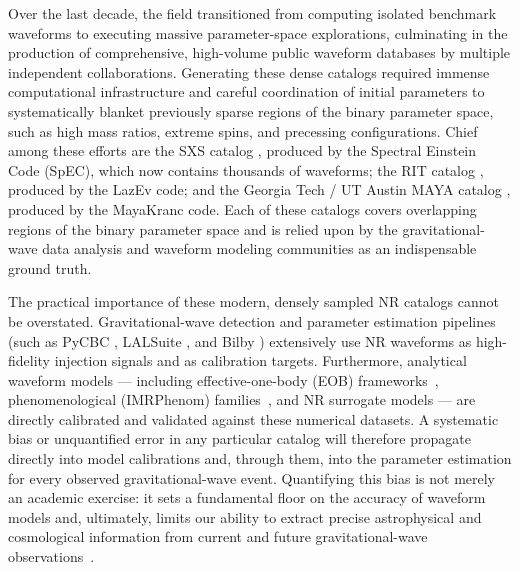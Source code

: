 \documentclass[%
 reprint,
superscriptaddress,
 amsmath,amssymb,
 aps,
]{revtex4-2}
\begin{document}
Over the last decade, the field transitioned from computing isolated benchmark waveforms to executing massive parameter-space explorations, culminating in the production of comprehensive, high-volume public waveform databases by multiple independent collaborations. Generating these dense catalogs required immense computational infrastructure and careful coordination of initial parameters to systematically blanket previously sparse regions of the binary parameter space, such as high mass ratios, extreme spins, and precessing configurations. Chief among these efforts are the SXS catalog \cite{Boyle:2008zua, Boyle:2019kee}, produced by the Spectral Einstein Code (SpEC), which now contains thousands of waveforms; the RIT catalog \cite{Healy:2020vre}, produced by the LazEv code; and the Georgia Tech / UT Austin MAYA catalog \cite{Jani:2016wkt}, produced by the MayaKranc code. Each of these catalogs covers overlapping regions of the binary parameter space and is relied upon by the gravitational-wave data analysis and waveform modeling communities as an indispensable ground truth.

The practical importance of these modern, densely sampled NR catalogs cannot be overstated. Gravitational-wave detection and parameter estimation pipelines (such as PyCBC \cite{Weaving:2023fji}, LALSuite \cite{Wette:2020air}, and Bilby \cite{Ashton:2018jfp, Romero-Shaw:2020owr, Veitch:2014wba}) extensively use NR waveforms as high-fidelity injection signals and as calibration targets. Furthermore, analytical waveform models — including effective-one-body (EOB) frameworks~\cite{Buonanno:1998gg, Buonanno:2000ef, Pan:2011gk, Babak:2016tgq, Taracchini:2014xjs, Bohe:2016gbl}, phenomenological (IMRPhenom) families~\cite{Ajith:2007qp, Husa:2015iqa, Khan:2015jqa, Pratten:2020fqn, Pratten:2020ceb}, and NR surrogate models — are directly calibrated and validated against these numerical datasets. A systematic bias or unquantified error in any particular catalog will therefore propagate directly into model calibrations and, through them, into the parameter estimation for every observed gravitational-wave event. Quantifying this bias is not merely an academic exercise: it sets a fundamental floor on the accuracy of waveform models and, ultimately, limits our ability to extract precise astrophysical and cosmological information from current and future gravitational-wave observations~\cite{Isi:2020gwy, Berti:2018vdi, Romero-Shaw:2020owr, Gabbard:2017lja, Dax:2021tsq, Acernese:2015gua, Blanchet:2002av, Damour:2016abl, Bini:2024icd, Barkett:2019sxy, Ruiz:2021gsv, Baiotti:2016qnr, Duez:2009yz, Liu:2020slm, Schutz:1986gp, Holz:2005df, Barack:2014csr, Anninos:1994gp, Davis:1971gg, Chandrasekhar:1975zza, LIGOScientific:2017ycc, LIGOScientific:2021usb, KAGRA:2018plz, KAGRA:2013rdx}.
\end{document}
